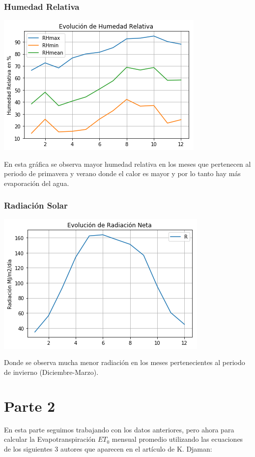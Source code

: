 \documentclass{article}
\begin{document}
\subsubsection*{Humedad Relativa}
\begin{center}
    \includegraphics[scale = 0.58]{RH.png}
\end{center}
En esta gráfica se observa mayor humedad relativa en los meses que pertenecen al periodo de primavera y verano donde el calor es mayor y por lo tanto hay más evaporación del agua.

\subsubsection*{Radiación Solar}
\begin{center}
    \includegraphics[scale = 0.6]{Rad.png}
\end{center}
Donde se observa mucha menor radiación en los meses pertenecientes al periodo de invierno (Diciembre-Marzo).

\section{Parte 2}
En esta parte seguimos trabajando con los datos anteriores, pero ahora para calcular la Evapotranspiración $ET_0$ mensual promedio utilizando las ecuaciones de los siguientes 3 autores que aparecen en el artículo de K. Djaman:
\\
\end{document}

